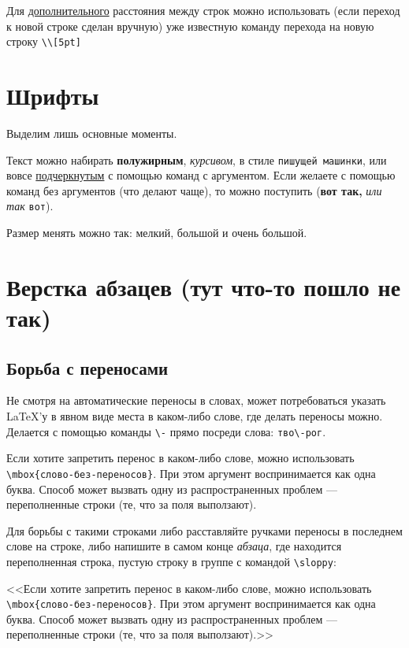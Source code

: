 \documentclass[a4paper,11pt]{article} %
\begin{document}
Для \underline{дополнительного} расстояния между строк можно использовать (если переход к новой строке сделан вручную) уже известную команду перехода на новую строку \verb"\\[5pt]"

\section{Шрифты}

Выделим лишь основные моменты.

Текст можно набирать \textbf{полужирным}, \textit{курсивом}, в стиле \texttt{пишущей машинки}, или вовсе \underline{подчеркнутым} с помощью команд с аргументом.
Если желаете с помощью команд без аргументов (что делают чаще), то можно поступить ({\bf вот так,} {\it или так} {\tt вот}).

Размер менять можно так: {\small мелкий}, {\large большой} и {\Large очень большой}.

\section{Верстка абзацев (тут что-то пошло не так)}

\subsection{Борьба с переносами}

Не смотря на автоматические переносы в словах, может потребоваться указать \LaTeX'у в явном виде места в каком-либо слове, где делать переносы можно. Делается с помощью команды \verb"\-" прямо посреди слова: \verb"тво\-рог".

Если хотите запретить перенос в каком-либо слове, можно использовать \verb"\mbox{слово-без-переносов}". При этом аргумент воспринимается как одна буква. Способ может вызвать одну из распространенных проблем --- переполненные строки (те, что за поля выползают).

Для борьбы с такими строками либо расставляйте ручками переносы в последнем слове на строке, либо напишите в самом конце \textit{абзаца}, где находится переполненная строка, пустую строку в группе с командой \verb"\sloppy":

<<Если хотите запретить перенос в каком-либо слове, можно использовать \verb"\mbox{слово-без-переносов}". При этом аргумент воспринимается как одна буква. Способ может вызвать одну из распространенных проблем --- переполненные строки (те, что за поля выползают).>>
{\sloppy

}
\end{document}
